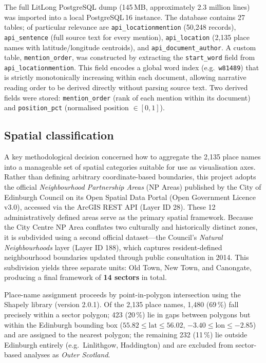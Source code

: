 \documentclass[11pt,a4paper]{article}
\begin{document}
The full LitLong PostgreSQL dump (145\,MB, approximately 2.3 million lines) was imported into a local PostgreSQL\,16 instance. The database contains 27 tables; of particular relevance are \texttt{api\_locationmention} (50,248 records), \texttt{api\_sentence} (full source text for every mention), \texttt{api\_location} (2,135 place names with latitude/longitude centroids), and \texttt{api\_document\_author}. A custom table, \texttt{mention\_order}, was constructed by extracting the \texttt{start\_word} field from \texttt{api\_locationmention}. This field encodes a global word index (e.g.\ \texttt{w81489}) that is strictly monotonically increasing within each document, allowing narrative reading order to be derived directly without parsing source text. Two derived fields were stored: \texttt{mention\_order} (rank of each mention within its document) and \texttt{position\_pct} (normalised position $\in [0,1]$).

\subsection*{Spatial classification}

A key methodological decision concerned how to aggregate the 2,135 place names into a manageable set of spatial categories suitable for use as visualisation axes. Rather than defining arbitrary coordinate-based boundaries, this project adopts the official \emph{Neighbourhood Partnership Areas} (NP Areas) published by the City of Edinburgh Council on its Open Spatial Data Portal (Open Government Licence v3.0), accessed via the ArcGIS REST API (Layer ID 28). These 12 administratively defined areas serve as the primary spatial framework. Because the City Centre NP Area conflates two culturally and historically distinct zones, it is subdivided using a second official dataset---the Council's \emph{Natural Neighbourhoods} layer (Layer ID 188), which captures resident-defined neighbourhood boundaries updated through public consultation in 2014. This subdivision yields three separate units: Old Town, New Town, and Canongate, producing a final framework of \textbf{14 sectors} in total.

Place-name assignment proceeds by point-in-polygon intersection using the Shapely library (version 2.0.1). Of the 2,135 place names, 1,480 (69\,\%) fall precisely within a sector polygon; 423 (20\,\%) lie in gaps between polygons but within the Edinburgh bounding box ($55.82 \leq \mathrm{lat} \leq 56.02$, $-3.40 \leq \mathrm{lon} \leq -2.85$) and are assigned to the nearest polygon; the remaining 232 (11\,\%) lie outside Edinburgh entirely (e.g.\ Linlithgow, Haddington) and are excluded from sector-based analyses as \emph{Outer Scotland}.
\end{document}
